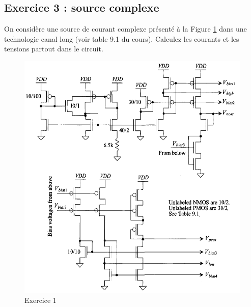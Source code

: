 \documentclass[paper=a4, fontsize=11pt]{article} %
\numberwithin{equation}{section} %
\numberwithin{figure}{section} %
\numberwithin{table}{section} %
\begin{document}
\subsection*{Exercice 3 : source complexe}
On considère une source de courant complexe présenté à la Figure \ref{fig10-3} dans une technologie canal long (voir table 9.1 du cours). Calculez les courants et les tensions partout dans le circuit.

\begin{figure}[!htbp]
   \centering
   \includegraphics[width=18cm]{figure/fig10-3-bis.png}
   \caption{Exercice 1}
   \label{fig10-3}
\end{figure}
\newpage
\end{document}
